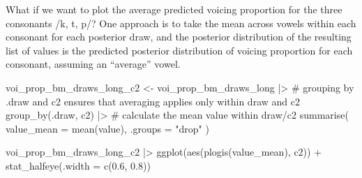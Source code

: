 \documentclass[
  authoryear,
  preprint,
  3p]{elsarticle}
\newenvironment{Shaded}{\begin{snugshade}}{\end{snugshade}}
\newcommand{\AttributeTok}[1]{\textcolor[rgb]{0.40,0.45,0.13}{#1}}
\newcommand{\CommentTok}[1]{\textcolor[rgb]{0.37,0.37,0.37}{#1}}
\newcommand{\FloatTok}[1]{\textcolor[rgb]{0.68,0.00,0.00}{#1}}
\newcommand{\FunctionTok}[1]{\textcolor[rgb]{0.28,0.35,0.67}{#1}}
\newcommand{\NormalTok}[1]{\textcolor[rgb]{0.00,0.23,0.31}{#1}}
\newcommand{\OtherTok}[1]{\textcolor[rgb]{0.00,0.23,0.31}{#1}}
\newcommand{\SpecialCharTok}[1]{\textcolor[rgb]{0.37,0.37,0.37}{#1}}
\newcommand{\StringTok}[1]{\textcolor[rgb]{0.13,0.47,0.30}{#1}}
\begin{document}
\begin{figure}[H]


\caption{\label{fig-voi-prop-bm-1}}

\end{figure}%

What if we want to plot the average predicted voicing proportion for the
three consonants /k, t, p/? One approach is to take the mean across
vowels within each consonant for each posterior draw, and the posterior
distribution of the resulting list of values is the predicted posterior
distribution of voicing proportion for each consonant, assuming an
``average'' vowel.

\begin{Shaded}
\begin{Highlighting}[]
\NormalTok{voi\_prop\_bm\_draws\_long\_c2 }\OtherTok{\textless{}{-}}\NormalTok{ voi\_prop\_bm\_draws\_long }\SpecialCharTok{|\textgreater{}} 
  \CommentTok{\# grouping by .draw and c2 ensures that averaging applies only within draw and c2}
  \FunctionTok{group\_by}\NormalTok{(.draw, c2) }\SpecialCharTok{|\textgreater{}} 
  \CommentTok{\# calculate the mean value within draw/c2}
  \FunctionTok{summarise}\NormalTok{(}
    \AttributeTok{value\_mean =} \FunctionTok{mean}\NormalTok{(value), }\AttributeTok{.groups =} \StringTok{"drop"}
\NormalTok{  )}

\NormalTok{voi\_prop\_bm\_draws\_long\_c2 }\SpecialCharTok{|\textgreater{}} 
  \FunctionTok{ggplot}\NormalTok{(}\FunctionTok{aes}\NormalTok{(}\FunctionTok{plogis}\NormalTok{(value\_mean), c2)) }\SpecialCharTok{+}
  \FunctionTok{stat\_halfeye}\NormalTok{(}\AttributeTok{.width =} \FunctionTok{c}\NormalTok{(}\FloatTok{0.6}\NormalTok{, }\FloatTok{0.8}\NormalTok{))}
\end{Highlighting}
\end{Shaded}
\end{document}
